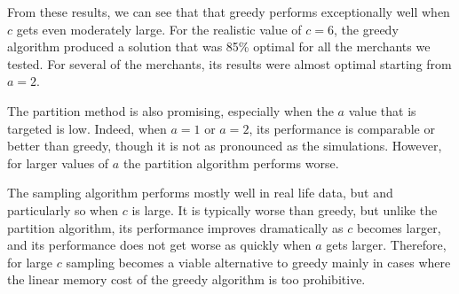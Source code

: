 From these results, we can see that that greedy performs exceptionally
well when $c$ gets even moderately large.  For the realistic value of
$c=6$, the greedy algorithm produced a solution that was 85\% optimal
for all the merchants we tested. For several of the merchants, its
results were almost optimal starting from $a=2$. \vs

The partition method is also promising, especially when the $a$ value
that is targeted is low. Indeed, when $a=1$ or $a=2$, its performance
is comparable or better than greedy, though it is not as pronounced as
the simulations. However, for larger values of $a$ the partition
algorithm performs worse. \vs

The sampling algorithm performs mostly well in real life data, but and
particularly so when $c$ is large. It is typically worse than
greedy, but unlike the partition algorithm, its performance improves
dramatically as $c$ becomes larger, and its performance does not get
worse as quickly when $a$ gets larger. Therefore, for large $c$ 
sampling becomes a viable alternative to greedy mainly in cases where the
linear memory cost of the greedy algorithm is too prohibitive. 
